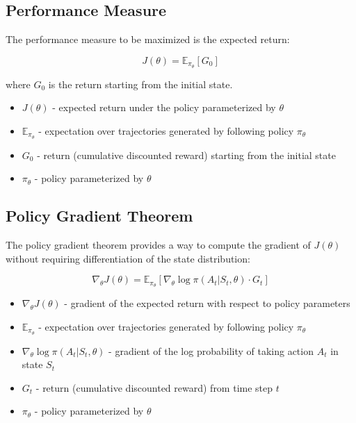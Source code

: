 \documentclass[11pt,a4paper]{article}
\begin{document}
\subsection{Performance Measure}

The performance measure to be maximized is the expected return:

\begin{equation}
J(\theta) = \mathbb{E}_{\pi_\theta} [G_0]
\end{equation}

where $G_0$ is the return starting from the initial state.

\begin{tcolorbox}[title=Notation Overview]
\begin{itemize}
    \item $J(\theta)$ - expected return under the policy parameterized by $\theta$
    \item $\mathbb{E}_{\pi_\theta}$ - expectation over trajectories generated by following policy $\pi_\theta$
    \item $G_0$ - return (cumulative discounted reward) starting from the initial state
    \item $\pi_\theta$ - policy parameterized by $\theta$
\end{itemize}
\end{tcolorbox}

\subsection{Policy Gradient Theorem}

The policy gradient theorem provides a way to compute the gradient of $J(\theta)$ without requiring differentiation of the state distribution:

\begin{equation}
\nabla_\theta J(\theta) = \mathbb{E}_{\pi_\theta} [\nabla_\theta \log \pi(A_t|S_t, \theta) \cdot G_t]
\end{equation}

\begin{tcolorbox}[title=Notation Overview]
\begin{itemize}
    \item $\nabla_\theta J(\theta)$ - gradient of the expected return with respect to policy parameters
    \item $\mathbb{E}_{\pi_\theta}$ - expectation over trajectories generated by following policy $\pi_\theta$
    \item $\nabla_\theta \log \pi(A_t|S_t, \theta)$ - gradient of the log probability of taking action $A_t$ in state $S_t$
    \item $G_t$ - return (cumulative discounted reward) from time step $t$
    \item $\pi_\theta$ - policy parameterized by $\theta$
\end{itemize}
\end{tcolorbox}
\end{document}

